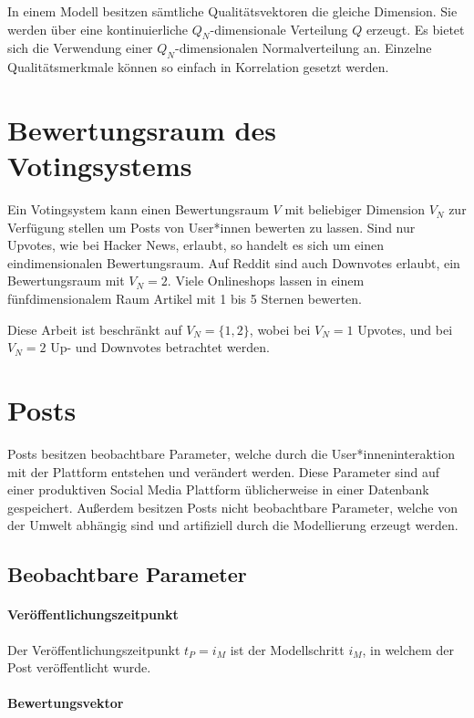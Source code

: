 In einem Modell besitzen sämtliche Qualitätsvektoren die gleiche Dimension. Sie werden über eine kontinuierliche $Q_N$-dimensionale Verteilung $Q$ erzeugt. Es bietet sich die Verwendung einer $Q_N$-dimensionalen Normalverteilung an. Einzelne Qualitätsmerkmale können so einfach in Korrelation gesetzt werden. 

\section{Bewertungsraum des Votingsystems}

Ein Votingsystem kann einen Bewertungsraum $V$ mit beliebiger Dimension $V_N$ zur Verfügung stellen um Posts von User*innen bewerten zu lassen. Sind nur Upvotes, wie bei Hacker News, erlaubt, so handelt es sich um einen eindimensionalen Bewertungsraum. Auf Reddit sind auch Downvotes erlaubt, ein Bewertungsraum mit $V_N = 2$. Viele Onlineshops lassen in einem fünfdimensionalem Raum Artikel mit 1 bis 5 Sternen bewerten.

Diese Arbeit ist beschränkt auf $V_N = \{1,2\}$, wobei bei $V_N = 1$ Upvotes, und bei $V_N = 2$ Up- und Downvotes betrachtet werden. 

\section{Posts}

Posts besitzen beobachtbare Parameter, welche durch die User*inneninteraktion mit der Plattform entstehen und verändert werden. Diese Parameter sind auf einer produktiven Social Media Plattform üblicherweise in einer Datenbank gespeichert. Außerdem besitzen Posts nicht beobachtbare Parameter, welche von der Umwelt abhängig sind und artifiziell durch die Modellierung erzeugt werden.

\subsection{Beobachtbare Parameter}

\paragraph{Veröffentlichungszeitpunkt}
Der Veröffentlichungszeitpunkt $t_P = i_M$ ist der Modellschritt $i_M$, in welchem der Post veröffentlicht wurde.

\paragraph{Bewertungsvektor}

